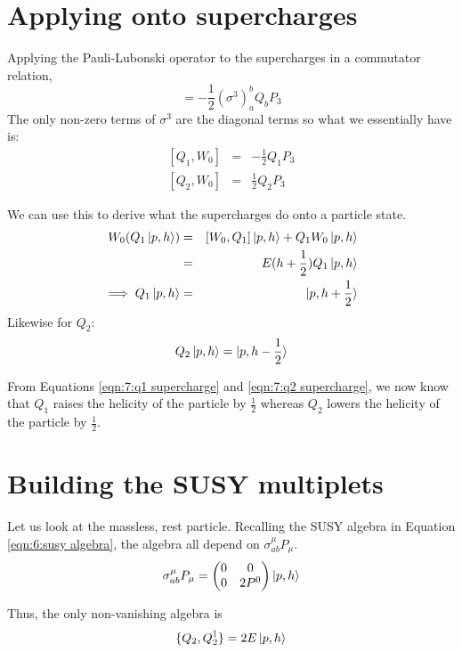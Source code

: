 \section{Applying onto supercharges}
\label{ch:7:applying onto supercharges}
Applying the Pauli-Lubonski operator to the supercharges in a commutator relation,
\begin{equation}
    [Q_a, W^0] = - \frac{1}{2} (\sigma^3)^b_a Q_b P_3
\end{equation}
The only non-zero terms of $\sigma^3$ are the diagonal terms so what we essentially have is:
\begin{eqnarray}
    \left[ Q_1, W_0\right] &=& - \frac{1}{2}Q_1 P_3 \\
    \left[ Q_2, W_0\right] &=& \frac{1}{2}Q_2 P_3
\end{eqnarray}  

We can use this to derive what the supercharges do onto a particle state.
\begin{eqnarray}
    W_0(Q_1\ket{p, h}) &=& [W_0, Q_1] \ket{p,h} + Q_1W_0\ket{p,h} \nonext
    &=& E(h+\frac{1}{2}) Q_1 \ket{p,h} \nonext
    \implies Q_1 \ket{p,h} &=& \ket{p, h+\frac{1}{2}}
    \label{eqn:7:q1 supercharge}
\end{eqnarray}
Likewise for $Q_2$:
\begin{equation}
    Q_2 \ket{p,h} = \ket{p, h-\frac{1}{2}}
    \label{eqn:7:q2 supercharge}
\end{equation}

From Equations \ref{eqn:7:q1 supercharge} and \ref{eqn:7:q2 supercharge}, we now know that $Q_1$ raises the helicity of the particle by $\frac{1}{2}$ whereas $Q_2$ lowers the helicity of the particle by $\frac{1}{2}$.

\section{Building the SUSY multiplets}
Let us look at the massless, rest particle. Recalling the SUSY algebra in Equation \ref{eqn:6:susy algebra}, the algebra all depend on $\sigma^\mu_{ab}P_\mu$.
\begin{equation}
    \sigma^\mu_{ab} P_\mu =
    \begin{pmatrix}
        0 & 0 \\ 0 & 2P^0
    \end{pmatrix} \ket{p,h}
\end{equation}

Thus, the only non-vanishing algebra is
\begin{equation}
    \{Q_2, Q_2^\dagger\} = 2 E \ket{p,h}
\end{equation}

